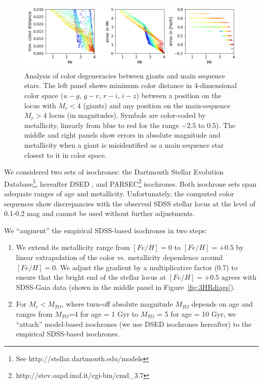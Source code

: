 \begin{figure}[ht!]
\includegraphics[width=1.0\textwidth,angle=0]{figures/RGdegeneracy.png}
\caption{Analysis of color degeneracies between giants and main  sequence stars. The left panel shows minimum color distance in
  4-dimensional color space ($u-g$, $g-r$, $r-i$, $i-z$) between a position on the locus with $M_r<4$ (giants) and any position on the
  main-sequence $M_r>4$ locus (in magnitudes). Symbols are color-coded by metallicity, linearly from blue to red for the range $-2.5$ to 0.5).
  The middle and right panels show errors in absolute magnitude and metallicity when a giant is misidentified as a main sequence star
  closest to it in color space.} 
\label{fig:RGdegeneracy}
\end{figure}

We considered two sets of isochrones: the Dartmouth Stellar Evolution Database\footnote{See http://stellar.dartmouth.edu/models},
hereafter DSED \citep{2008ApJS..178...89D}, and PARSEC\footnote{http://stev.oapd.inaf.it/cgi-bin/cmd\_3.7} \citep{2012MNRAS.427..127B} isochrones. 
Both isochrone sets span adequate ranges of age and metallicity. Unfortunately, the computed color sequences show discrepancies
with the observed SDSS stellar locus at the level of 0.1-0.2 mag and cannot be used without further adjustments.

We ``augment'' the empirical SDSS-based isochrones in two steps:
\begin{enumerate}
\item We extend its metallicity range from $[Fe/H]=0$ to $[Fe/H]=+0.5$ by linear extrapolation of the color vs. metallicity
  dependence around $[Fe/H]=0$. We adjust the gradient by a multiplicative factor (0.7) to ensure that the bright end of the
  stellar locus at $[Fe/H]=+0.5$ agrees with SDSS-Gaia data (shown in the middle panel in Figure~\ref{fig:3HRdiags}).
\item 
  For $M_r < M_{TO}$, where turn-off absolute magnitude $M_{TO}$ depends on age and ranges from $M_{TO}$=4 for age = 1 Gyr
  to $M_{TO}$ = 5 for age = 10 Gyr, we ``attach'' model-based
  isochrones (we use DSED isochrones hereafter) to the empirical
  SDSS-based isochrones.
\end{enumerate}


